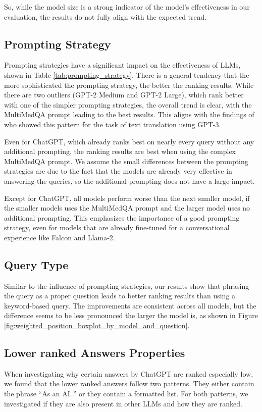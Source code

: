 So, while the model size is a strong indicator of the model's effectiveness in our evaluation, the results do not fully align with the expected trend.

\subsection{Prompting Strategy}
Prompting strategies have a significant impact on the effectiveness of LLMs, shown in Table \ref{tab:prompting_strategy}.
There is a general tendency that the more sophisticated the prompting strategy, the better the ranking results.
While there are two outliers (GPT-2 Medium and GPT-2 Large), which rank better with one of the simpler prompting strategies, the overall trend is clear, with the MultiMedQA prompt leading to the best results.
This aligns with the findings of \cite{reynolds:2021:Prompt} who showed this pattern for the task of text translation using GPT-3.

Even for ChatGPT, which already ranks best on nearly every query without any additional prompting, the ranking results are best when using the complex MultiMedQA prompt.
We assume the small differences between the prompting strategies are due to the fact that the models are already very effective in answering the queries, so the additional prompting does not have a large impact.

Except for ChatGPT, all models perform worse than the next smaller model, if the smaller models uses the MultiMedQA prompt and the larger model uses no additional prompting.
This emphasizes the importance of a good prompting strategy, even for models that are already fine-tuned for a conversational experience like Falcon and Llama-2.

\subsection{Query Type}
Similar to the influence of prompting strategies, our results show that phrasing the query as a proper question leads to better ranking results than using a keyword-based query.
The improvements are consistent across all models, but the difference seems to be less pronounced the larger the model is, as shown in Figure \ref{fig:weighted_position_boxplot_by_model_and_question}.

\subsection{Lower ranked Answers Properties}
When investigating why certain answers by ChatGPT are ranked especially low, we found that the lower ranked answers follow two patterns.
They either contain the phrase ``As an AI..'' or they contain a formatted list.
For both patterns, we investigated if they are also present in other LLMs and how they are ranked.

